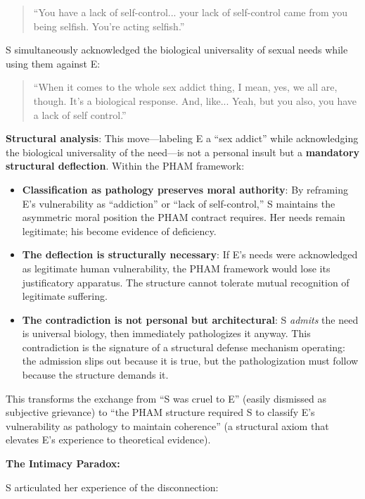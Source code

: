 \documentclass[12pt,openany]{book}
\numberwithin{equation}{chapter}
\begin{document}
\begin{quote}
``You have a lack of self-control... your lack of self-control came from you being selfish. You're acting selfish.''
\end{quote}

S simultaneously acknowledged the biological universality of sexual needs while using them against E:

\begin{quote}
``When it comes to the whole sex addict thing, I mean, yes, we all are, though. It's a biological response. And, like... Yeah, but you also, you have a lack of self control.''
\end{quote}

\textbf{Structural analysis}: This move---labeling E a ``sex addict'' while acknowledging the biological universality of the need---is not a personal insult but a \textbf{mandatory structural deflection}. Within the PHAM framework:

\begin{itemize}
    \item \textbf{Classification as pathology preserves moral authority}: By reframing E's vulnerability as ``addiction'' or ``lack of self-control,'' S maintains the asymmetric moral position the PHAM contract requires. Her needs remain legitimate; his become evidence of deficiency.
    \item \textbf{The deflection is structurally necessary}: If E's needs were acknowledged as legitimate human vulnerability, the PHAM framework would lose its justificatory apparatus. The structure cannot tolerate mutual recognition of legitimate suffering.
    \item \textbf{The contradiction is not personal but architectural}: S \textit{admits} the need is universal biology, then immediately pathologizes it anyway. This contradiction is the signature of a structural defense mechanism operating: the admission slips out because it is true, but the pathologization must follow because the structure demands it.
\end{itemize}

This transforms the exchange from ``S was cruel to E'' (easily dismissed as subjective grievance) to ``the PHAM structure required S to classify E's vulnerability as pathology to maintain coherence'' (a structural axiom that elevates E's experience to theoretical evidence).

\textbf{The Intimacy Paradox:}

S articulated her experience of the disconnection:
\end{document}
